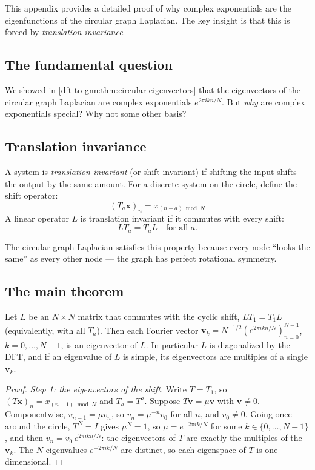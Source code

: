 \begin{notechapter}
This appendix provides a detailed proof of why complex exponentials
are the eigenfunctions of the circular graph Laplacian. The key insight
is that this is forced by \emph{translation invariance}.

\subsection{The fundamental question}

We showed in \cref{dft-to-gnn:thm:circular-eigenvectors} that the eigenvectors of the circular graph
Laplacian are complex exponentials $e^{2\pi i kn/N}$. But \emph{why}
are complex exponentials special? Why not some other basis?

\subsection{Translation invariance}

A system is \emph{translation-invariant} (or shift-invariant) if
shifting the input shifts the output by the same amount. For a discrete
system on the circle, define the shift operator:
\[
(T_a \mathbf{x})_n = x_{(n-a) \bmod N}
\]
A linear operator $L$ is translation invariant if it commutes with every shift:
\[
L T_a = T_a L \quad \text{for all } a .
\]

The circular graph Laplacian satisfies this property because every node
``looks the same'' as every other node --- the graph has perfect rotational
symmetry.

\subsection{The main theorem}

\begin{theorem}
\label{dft-to-gnn:thm:app-forced-eigenfunctions}
Let $L$ be an $N\times N$ matrix that commutes with the cyclic shift, $LT_1 = T_1L$ (equivalently, with all $T_a$). Then each Fourier vector $\mathbf{v}_k = N^{-1/2}(e^{2\pi i kn/N})_{n=0}^{N-1}$, $k = 0, \ldots, N-1$, is an eigenvector of $L$. In particular $L$ is diagonalized by the DFT, and if an eigenvalue of $L$ is simple, its eigenvectors are multiples of a single $\mathbf{v}_k$.
\end{theorem}

\begin{proof}
\emph{Step 1: the eigenvectors of the shift.} Write $T = T_1$, so $(T\mathbf{x})_n = x_{(n-1)\bmod N}$ and $T_a = T^a$. Suppose $T\mathbf{v} = \mu\mathbf{v}$ with $\mathbf{v} \ne 0$. Componentwise, $v_{n-1} = \mu v_n$, so $v_n = \mu^{-n}v_0$ for all $n$, and $v_0 \ne 0$. Going once around the circle, $T^N = I$ gives $\mu^N = 1$, so $\mu = e^{-2\pi i k/N}$ for some $k\in\{0, \ldots, N-1\}$, and then $v_n = v_0\,e^{2\pi i kn/N}$: the eigenvectors of $T$ are exactly the multiples of the $\mathbf{v}_k$. The $N$ eigenvalues $e^{-2\pi i k/N}$ are distinct, so each eigenspace of $T$ is one-dimensional.


\end{proof}
\end{notechapter}
